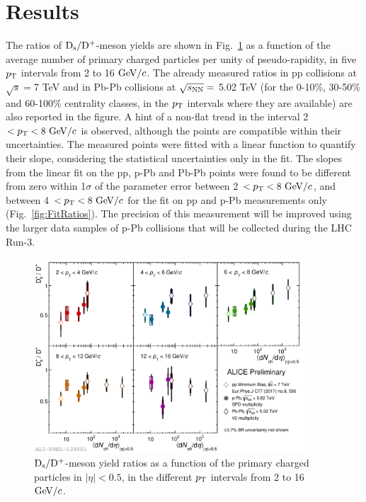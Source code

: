 \section{Results}
\label{sec:results}
The ratios of ${\rm D_s}/{\rm D^+}$-meson yields are shown in Fig.~\ref{fig:DsDplusRatios} as a function of
the average number of primary charged particles per unity of pseudo-rapidity, 
in five $p_{\rm T}$ intervals from 2 to 16 $\mathrm{GeV}/c$.
The already measured ratios in pp collisions at $\sqrt{s}=$7 TeV and 
in Pb-Pb collisions at $\sqrt{s_{\rm NN}}=$ 5.02 TeV
(for the 0-10\%, 30-50\% and 60-100\% centrality classes, in the 
$p_{\rm T}$ intervals where they are available) are also reported in the figure.
A hint of a non-flat trend in the interval 2 $< p_{\rm T} < 8~\mathrm{GeV}/c$ is observed, although 
the points are compatible within their uncertainties. The measured points were 
fitted with a linear function to quantify their slope, considering the statistical 
uncertainties only in the fit. The slopes from the linear fit on the pp, 
p-Pb and Pb-Pb points were found to be different from zero within 
1$\sigma$ of the parameter error between 2 $< p_{\rm T} < 8 ~\mathrm{GeV}/c$, 
and between 4 $< p_{\rm T} < 8 ~\mathrm{GeV}/c$ for the fit on pp and p-Pb measurements only (Fig.~\ref{fig:FitRatios}).
The precision of this measurement will be improved using the 
larger data samples of p-Pb collisions that will be collected during the LHC Run-3.



\begin{figure}[h!]
    \begin{center}
          \includegraphics[width=0.9\textwidth]{./FigCap6/DsOverDplusVsMult_pp_pPb_PbPb.pdf}
    \end{center}
    \caption{ ${\rm D_s}/{\rm D^+}$-meson yield ratios as a function of the primary charged particles in $|\eta|<0.5$, in the different $p_{\rm T}$ intervals from 2 to 16 $\mathrm{GeV}/c$.}
    \label{fig:DsDplusRatios}
\end{figure}

